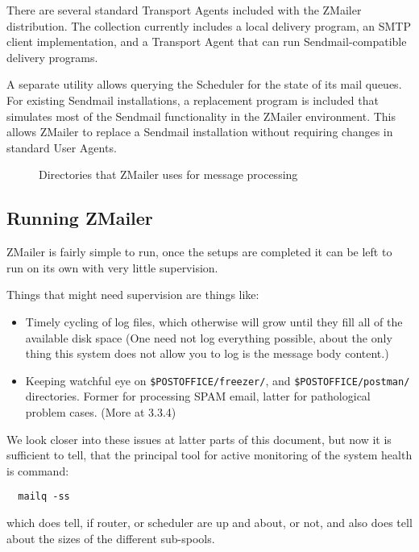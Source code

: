 There are several standard Transport Agents included with the ZMailer
distribution.  The collection currently includes a local delivery program,
an SMTP client implementation, and a Transport Agent that can run
Sendmail-compatible delivery programs.

A separate utility allows querying the Scheduler for the state of its mail
queues.  For existing Sendmail installations, a replacement program is
included that simulates most of the Sendmail functionality in the ZMailer
environment.  This allows ZMailer to replace a Sendmail installation
without requiring changes in standard User Agents.


\begin{figure}[ht]
  \centering
  \caption{\label{fig:zmdirs}Directories that ZMailer uses for message processing}
\end{figure}


\subsection{Running ZMailer}

ZMailer is fairly simple to run, once the setups are completed
it can be left to run on its own with very little supervision.

Things that might need supervision are things like:
\begin{itemize}
\item Timely cycling of log files, which otherwise will grow until
they fill all of the available disk space  (One need not log
everything possible, about the only thing this system does not
allow you to log is the message body content.)
\item Keeping watchful eye on  {\tt \$POSTOFFICE/freezer/}, and 
{\tt \$POSTOFFICE/postman/}
directories.  Former for processing SPAM email, latter for
pathological problem cases.  (More at  3.3.4)
\end{itemize}

We look closer into these issues at latter parts of this document,
but now it is sufficient to tell, that the principal tool for active
monitoring of the system health is command:
\begin{verbatim}
  mailq -ss
\end{verbatim}

which does tell, if router, or scheduler are up and about, or not,
and also does tell about the sizes of the different sub-spools.

